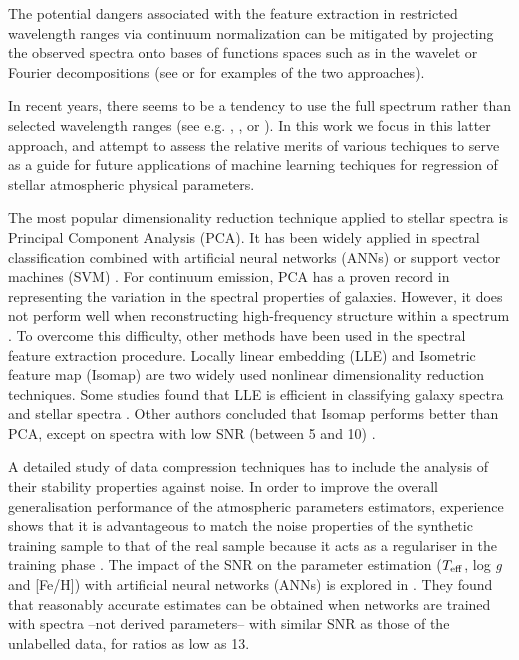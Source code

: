 \documentclass[a4paper,fleqn,usenatbib]{mnras}
\begin{document}
The potential dangers associated with the feature extraction in
restricted wavelength ranges via continuum normalization can be
mitigated by projecting the observed spectra onto bases of functions
spaces such as in the wavelet or Fourier decompositions (see
\cite{2010PASP..122..608M} or \cite{2015ApJS..218....3L} for examples
of the two approaches).

In recent years, there seems to be a tendency to use the full spectrum
rather than selected wavelength ranges (see
e.g. \cite{2014A&A...567A...5R}, \cite{2015ApJ...808...16N}, or
\cite{2015arXiv151000111R}). In this work we focus in this latter
approach, and attempt to assess the relative merits of various
techiques to serve as a guide for future applications of machine
learning techiques for regression of stellar atmospheric physical
parameters.

The most popular dimensionality reduction technique applied
to stellar spectra is Principal Component Analysis (PCA). It has
been widely applied in spectral classification combined with
artificial neural networks (ANNs) \citep{singh:98} or support vector
machines (SVM) \citep{fiorentin:08b}. For continuum emission, PCA has a
proven record in representing the variation in the spectral properties
of galaxies. However, it does not perform well when reconstructing
high-frequency structure within a spectrum \citep{vanderplas:09}. To
overcome this difficulty, other methods have been used in the
spectral feature extraction procedure. Locally linear embedding
(LLE) \citep{roweisLLE:00} and Isometric feature map (Isomap) 
\citep{tenenbaum:00} are two widely used nonlinear dimensionality 
reduction techniques. Some studies found that LLE is efficient in 
classifying galaxy spectra \citep{vanderplas:09} and stellar spectra 
\citep{daniel:11}. Other authors concluded that Isomap performs better 
than PCA, except on spectra with low SNR (between 5 and 10) \citep{bu:14}.

A detailed study of data compression techniques has to include
the analysis of their stability properties against noise. In order
to improve the overall generalisation performance of the atmospheric
parameters estimators, experience shows that it is advantageous to
match the noise properties of the synthetic training sample to that of
the real sample because it acts as a regulariser in the training phase
\citep{fiorentin:08a}.  The impact of the SNR on the parameter
estimation ($T_{\rm eff}$, log \textit{g} and [Fe/H]) with artificial
neural networks (ANNs) is explored in \cite{snider:01}. They found
that reasonably accurate estimates can be obtained when networks are
trained with spectra --not derived parameters-- with similar SNR 
as those of the unlabelled data, for ratios as low as 13.
\end{document}
